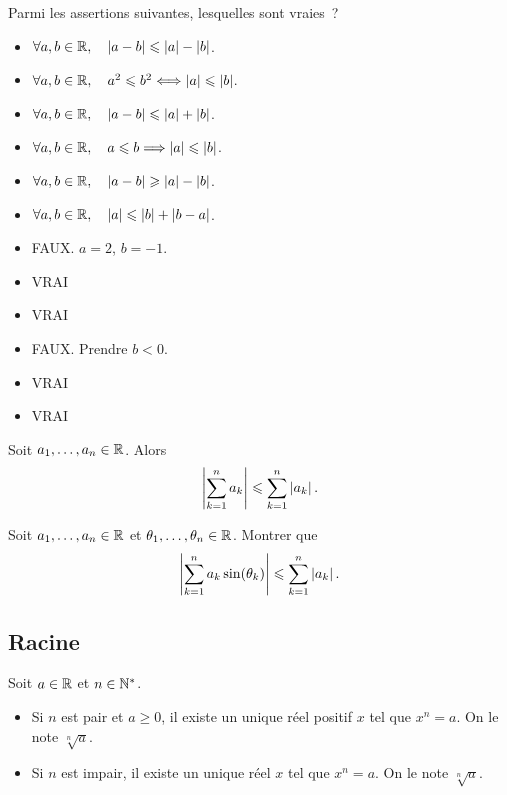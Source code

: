 \documentclass{magnoliaold}
\begin{document}
\begin{exoUnique}
\exo Parmi les assertions suivantes, lesquelles sont vraies~?
  \begin{multicols}{2}
  \begin{itemize}
  \item $\forall a,b\in\mathbb{R} ,\quad \left|a-b\right|\leqslant\left|a\right|-\left|b\right|$.
  \item $\forall a,b\in\mathbb{R} ,\quad a^2\leqslant b^2 \Longleftrightarrow \left|a\right|\leqslant\left|b\right|$.
  \item $\forall a,b\in\mathbb{R} ,\quad \left|a-b\right|\leqslant\left|a\right|+\left|b\right|$.
  \item $\forall a,b\in\mathbb{R} ,\quad a\leqslant b \Longrightarrow \left|a\right|\leqslant\left|b\right|$.
  \item $\forall a,b\in\mathbb{R} ,\quad \left|a-b\right|\geqslant\left|a\right|-\left|b\right|$.
  \item $\forall a,b\in\mathbb{R} ,\quad \left|a\right|\leqslant\left|b\right|+\left|b-a\right|$.
  \end{itemize}  
  \end{multicols}
\end{exoUnique}
\begin{sol}
\begin{itemize}
  \item FAUX. $a=2$, $b=-1$.
  \item VRAI
  \item VRAI
  \item FAUX. Prendre $b<0$.
  \item VRAI
  \item VRAI
  \end{itemize}  
  \end{sol}

\begin{proposition}
Soit $a_1,\ldots,a_n\in\mathbb{R}$. Alors
\[\left|\sum_{k=1}^n a_k\right|\leqslant \sum_{k=1}^n \left|a_k\right|.\]
\end{proposition}

\begin{exoUnique}
\exo Soit $a_1,\ldots,a_n\in\mathbb{R}$ et $\theta_1,\ldots,\theta_n\in\mathbb{R}$. Montrer
  que
  \[\left|\sum_{k=1}^n a_k \sin(\theta_k)\right|\leqslant\sum_{k=1}^n \left|a_k\right|.\]
\end{exoUnique}


\subsection{Racine}

\begin{definition}
Soit $a\in\mathbb{R}$ et $n\in{\mathbb{N}^*}$.
\begin{itemize}
\item Si $n$ est pair et $a\geq 0$, il existe un unique réel positif $x$ tel que
  $x^n=a$. On le note $\sqrt[n]{a}$.
\item Si $n$ est impair, il existe un unique réel $x$ tel que
  $x^n=a$. On le note $\sqrt[n]{a}$.
\end{itemize}
\end{definition}
\end{document}
